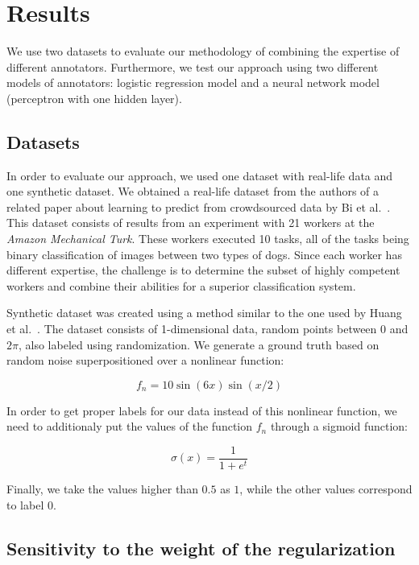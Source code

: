 \documentclass{llncs}
\begin{document}
 

\section{Results}

We use two datasets to evaluate our methodology of combining the expertise of different annotators. Furthermore, we test our approach using two different models of annotators: logistic regression model and a neural network model (perceptron with one hidden layer).

\subsection{Datasets}
In order to evaluate our approach, we used one dataset with real-life data and one synthetic dataset. We obtained a real-life dataset from the authors of a related paper about learning to predict from crowdsourced data by Bi et al.~\cite{bi2014learning}. This dataset consists of results from an experiment with 21 workers at the \textit{Amazon Mechanical Turk}. These workers executed 10 tasks, all of the tasks being binary classification of images between two types of dogs. Since each worker has different expertise, the challenge is to determine the subset of highly competent workers and combine their abilities for a superior classification system.

Synthetic dataset was created using a method similar to the one used by Huang et al.~\cite{xiao2013learning}. The dataset consists of 1-dimensional data, random points between $0$ and $2\pi$, also labeled using randomization. We generate a ground truth based on random noise superpositioned over a nonlinear function: 

\begin{equation}
f_n = 10\sin(6x)\sin(x/2)
\end{equation}

In order to get proper labels for our data instead of this nonlinear function, we need to additionaly put the values of the function $f_n$ through a sigmoid function:

\begin{equation}
\sigma(x) = \frac{1}{1+e^t}
\end{equation}

Finally, we take the values higher than $0.5$ as $1$, while the other values correspond to label $0$.

\subsection{Sensitivity to the weight of the regularization}
\end{document}
